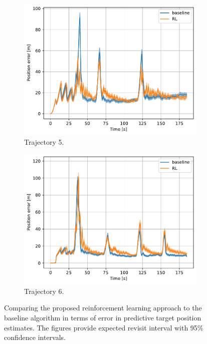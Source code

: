 \documentclass[english, 12pt, a4paper, elec, utf8, a-1b, online]{aaltothesis}
\begin{document}
\begin{figure}[htb]
\begin{subfigure}[b]{0.45\textwidth}
        \centering
        \includegraphics[width=\linewidth]{figures/benchmark/Simulations/mean_position_error4.pdf}
        \caption{Trajectory 5.}
        \label{fig:TL_T5}
    \end{subfigure}
    \hfill
    \begin{subfigure}[b]{0.45\textwidth}
        \centering
        \includegraphics[width=\linewidth]{figures/benchmark/Simulations/mean_position_error5.pdf}
        \caption{Trajectory 6.}
        \label{fig:TL_T6}
    \end{subfigure}
    \caption{Comparing the proposed reinforcement learning approach to the baseline algorithm in terms of error in predictive target position estimates.
    The figures provide expected revisit interval with 95\% confidence intervals.}
    \label{fig:position_error_comparison}
\end{figure}
\end{document}

